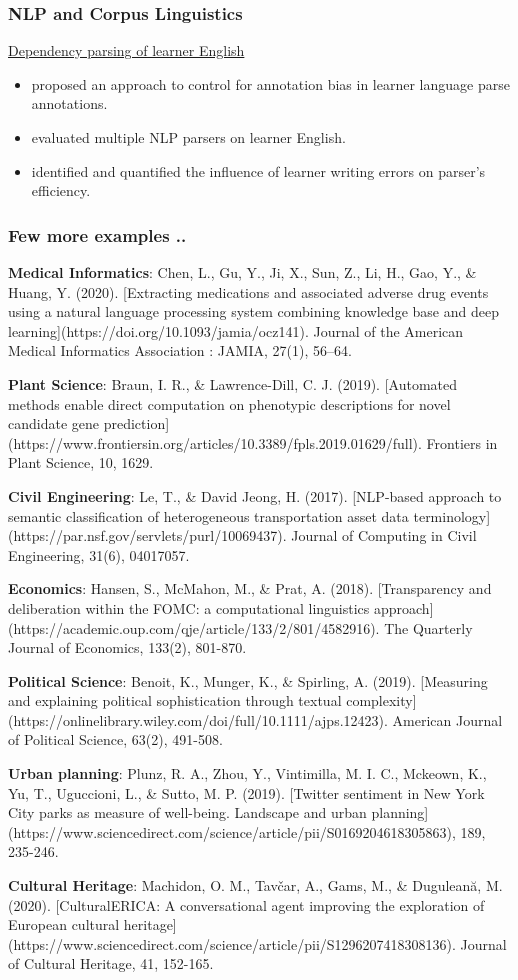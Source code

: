 \documentclass{beamer}
\begin{document}
\begin{frame}
\frametitle{NLP and Corpus Linguistics}
\href{https://doi.org/10.1075/ijcl.16080.hua}{Dependency parsing of learner English}
\begin{itemize}
\item proposed an approach to control for annotation bias in learner language parse annotations.
\item evaluated multiple NLP parsers on learner English.
\item identified and quantified the influence of learner writing errors on parser's efficiency.
\end{itemize}
\end{frame}

\begin{frame}
\frametitle{Few more examples ..}
\tiny
\textbf{Medical Informatics}: Chen, L., Gu, Y., Ji, X., Sun, Z., Li, H., Gao, Y., \& Huang, Y. (2020). [Extracting medications and associated adverse drug events using a natural language processing system combining knowledge base and deep learning](https://doi.org/10.1093/jamia/ocz141). Journal of the American Medical Informatics Association : JAMIA, 27(1), 56–64. 

\textbf{Plant Science}: Braun, I. R., \& Lawrence-Dill, C. J. (2019). [Automated methods enable direct computation on phenotypic descriptions for novel candidate gene prediction](https://www.frontiersin.org/articles/10.3389/fpls.2019.01629/full). Frontiers in Plant Science, 10, 1629.

\textbf{Civil Engineering}: Le, T., \& David Jeong, H. (2017). [NLP-based approach to semantic classification of heterogeneous transportation asset data terminology](https://par.nsf.gov/servlets/purl/10069437). Journal of Computing in Civil Engineering, 31(6), 04017057.

\textbf{Economics}: Hansen, S., McMahon, M., \& Prat, A. (2018). [Transparency and deliberation within the FOMC: a computational linguistics approach](https://academic.oup.com/qje/article/133/2/801/4582916). The Quarterly Journal of Economics, 133(2), 801-870.

\textbf{Political Science}: Benoit, K., Munger, K., \& Spirling, A. (2019). [Measuring and explaining political sophistication through textual complexity](https://onlinelibrary.wiley.com/doi/full/10.1111/ajps.12423). American Journal of Political Science, 63(2), 491-508.

\textbf{Urban planning}: Plunz, R. A., Zhou, Y., Vintimilla, M. I. C., Mckeown, K., Yu, T., Uguccioni, L., \& Sutto, M. P. (2019). [Twitter sentiment in New York City parks as measure of well-being. Landscape and urban planning](https://www.sciencedirect.com/science/article/pii/S0169204618305863), 189, 235-246.

\textbf{Cultural Heritage}: Machidon, O. M., Tavčar, A., Gams, M., \& Duguleană, M. (2020). [CulturalERICA: A conversational agent improving the exploration of European cultural heritage](https://www.sciencedirect.com/science/article/pii/S1296207418308136). Journal of Cultural Heritage, 41, 152-165.
\end{frame}
\end{document}
